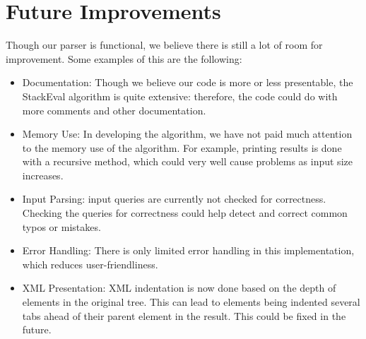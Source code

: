 \documentclass[11pt]{article}
\begin{document}
\section{Future Improvements}
Though our parser is functional, we believe there is still a lot of room for improvement. Some examples of this are the following:
\begin{itemize}
\item Documentation: Though we believe our code is more or less presentable, the StackEval algorithm is quite extensive: therefore, the code could do with more comments and other documentation.
\item Memory Use: In developing the algorithm, we have not paid much attention to the memory use of the algorithm. For example, printing results is done with a recursive method, which could very well cause problems as input size increases.
\item Input Parsing: input queries are currently not checked for correctness. Checking the queries for correctness could help detect and correct common typos or mistakes.
\item Error Handling: There is only limited error handling in this implementation, which reduces user-friendliness.
\item XML Presentation: XML indentation is now done based on the depth of elements in the original tree. This can lead to elements being indented several tabs ahead of their parent element in the result. This could be fixed in the future.
\end{itemize}

\newpage
\lstlistoflistings



\end{document}
